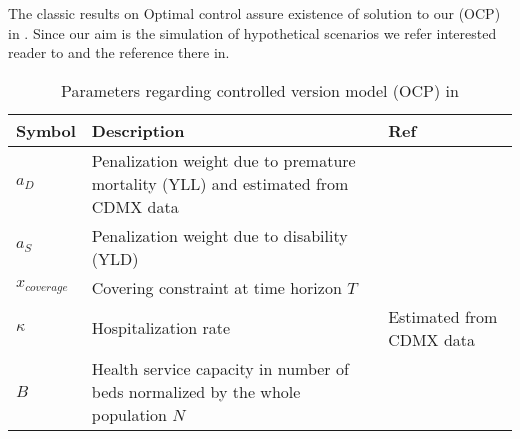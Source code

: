 The classic results on Optimal control assure existence
of solution to our (OCP) in . Since our aim
is the simulation of hypothetical scenarios we refer interested reader to
\cite{Clark, Yong, Seti} and the reference there in.

\begin{table}[htb]
    \centering
    \begin{tabular}{%
            >{\centering}
            p{}
            p{}
            p{}
    }
        \toprule
        \textbf{Symbol}
        & \textbf{Description}
        & \textbf{Ref}
        \\
        \midrule
            $a_D$
            &
                Penalization weight due to  premature mortality (YLL)
                and estimated from CDMX data
            & \cite{WhoDALY, conavi2020}
        \\
            $a_S$
            &
                Penalization weight due to disability (YLD)
            & \cite{Jo2020}
        \\
            $x_{coverage}$
            &
                Covering constraint at time horizon $T$
            &\cite{sage2020}

        \\
        $\kappa$
            &
                Hospitalization rate
            &
                Estimated from CDMX data
        \\
        $B$
        &
            Health service capacity in number of beds
            normalized by the whole
            population $N$
        &
            \cite{conavi2020}
        \\
        \bottomrule
    \end{tabular}
    \caption{
        Parameters regarding
        controlled version model (OCP) in 
    }
    \label{tbl:ocp_parameters_description}
\end{table}


